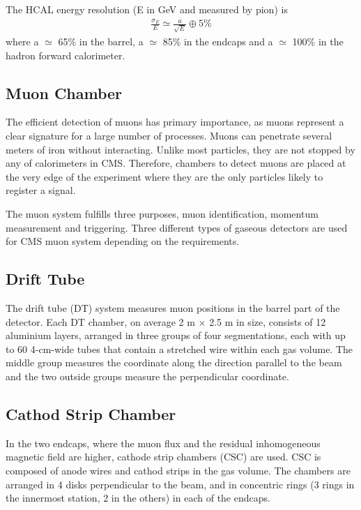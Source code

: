 The HCAL energy resolution (E in GeV and measured by pion) \cite{CMS_AN_2004-020} is
\begin{align}
\frac{\sigma_{E}}{E}\simeq\frac{a}{\sqrt{E}}\oplus 5\%
\end{align}
where a $\simeq$ 65\% in the barrel, a $\simeq$ 85\% in the endcaps and a $\simeq$ 100\% in the hadron forward calorimeter.

\subsection{Muon Chamber}

The efficient detection of muons has primary importance, as muons represent a clear signature for a large number of processes. Muons can penetrate several meters of iron without interacting. Unlike most particles, they are not stopped by any of calorimeters in CMS. Therefore, chambers to detect muons are placed at the very edge of the experiment where they are the only particles likely to register a signal.

The muon system fulfills three purposes, muon identification, momentum measurement and triggering. Three different types of gaseous detectors are used for CMS muon system depending on the requirements. 

\subsection*{Drift Tube}
The drift tube (DT) system measures muon positions in the barrel part of the detector. Each DT chamber, on average 2 m $\times$ 2.5 m in size, consists of 12 aluminium layers, arranged in three groups of four segmentations, each with up to 60 4-cm-wide tubes that contain a stretched wire within each gas volume. The middle group measures the coordinate along the direction parallel to the beam and the two outside groups measure the perpendicular coordinate.

\subsection*{Cathod Strip Chamber}
In the two endcaps, where the muon flux and the residual inhomogeneous magnetic field are higher, cathode strip chambers (CSC) are used. CSC is composed of anode wires and cathod strips in the gas volume. The chambers are arranged in 4 disks perpendicular to the beam, and in concentric rings (3 rings in the innermost station, 2 in the others) in each of the endcaps.

